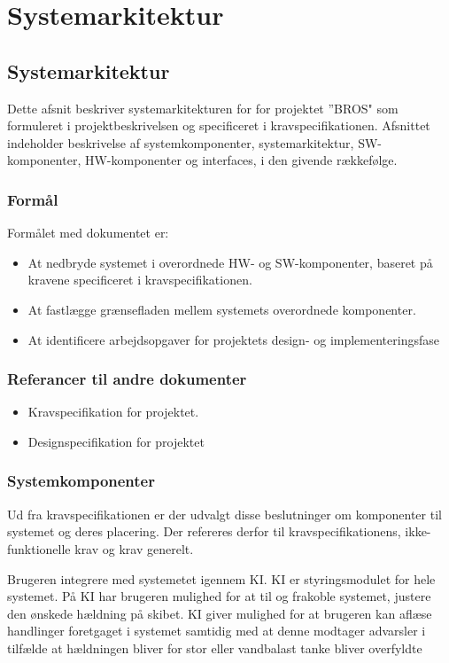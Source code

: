 \chapter{Systemarkitektur}
\section{Systemarkitektur}
Dette afsnit beskriver systemarkitekturen for for projektet ”BROS" som formuleret i projektbeskrivelsen og specificeret i kravspecifikationen.
Afsnittet indeholder beskrivelse af systemkomponenter, systemarkitektur, SW-komponenter, HW-komponenter og interfaces, i den givende rækkefølge.

\subsection{Formål}
Formålet med dokumentet er:
\begin{itemize}
\item At nedbryde systemet i overordnede HW- og SW-komponenter, baseret på kravene specificeret i kravspecifikationen.
\item At fastlægge grænsefladen mellem systemets overordnede komponenter.
\item At identificere arbejdsopgaver for projektets design- og implementeringsfase
\end{itemize}

\subsection{Referancer til andre dokumenter}
\begin{itemize}
\item Kravspecifikation for projektet.
\item Designspecifikation for projektet
\end{itemize}

\subsection{Systemkomponenter}
Ud fra kravspecifikationen er der udvalgt disse beslutninger om komponenter til systemet og deres placering. Der refereres derfor til kravspecifikationens, ikke-funktionelle krav og krav generelt.

Brugeren integrere med systemetet igennem KI. KI er styringsmodulet for hele systemet. På KI har brugeren mulighed for at til og frakoble systemet, justere den ønskede hældning på skibet. KI giver mulighed for at brugeren kan aflæse handlinger foretgaget i systemet samtidig med at denne modtager advarsler i tilfælde at hældningen bliver for stor eller vandbalast tanke bliver overfyldte